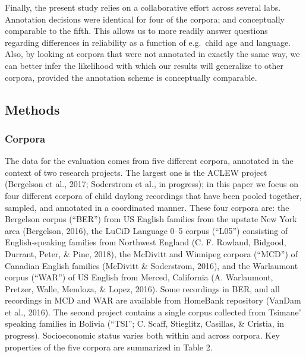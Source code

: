 \documentclass[english,floatsintext,man]{apa6}
\begin{document}
Finally, the present study relies on a collaborative effort across
several labs. Annotation decisions were identical for four of the
corpora; and conceptually comparable to the fifth. This allows us to
more readily answer questions regarding differences in reliability as a
function of e.g.~child age and language. Also, by looking at corpora
that were not annotated in exactly the same way, we can better infer the
likelihood with which our results will generalize to other corpora,
provided the annotation scheme is conceptually comparable.

\subsection{Methods}\label{methods}

\subsubsection{Corpora}\label{corpora}

The data for the evaluation comes from five different corpora, annotated
in the context of two research projects. The largest one is the ACLEW
project (Bergelson et al., 2017; Soderstrom et al., in progress); in
this paper we focus on four different corpora of child daylong
recordings that have been pooled together, sampled, and annotated in a
coordinated manner. These four corpora are: the Bergelson corpus
(\enquote{BER}) from US English families from the upstate New York area
(Bergelson, 2016), the LuCiD Language 0--5 corpus (\enquote{L05})
consisting of English-speaking families from Northwest England (C. F.
Rowland, Bidgood, Durrant, Peter, \& Pine, 2018), the McDivitt and
Winnipeg corpora (\enquote{MCD}) of Canadian English families (McDivitt
\& Soderstrom, 2016), and the Warlaumont corpus (\enquote{WAR}) of US
English from Merced, California (A. Warlaumont, Pretzer, Walle, Mendoza,
\& Lopez, 2016). Some recordings in BER, and all recordings in MCD and
WAR are available from HomeBank repository (VanDam et al., 2016). The
second project contains a single corpus collected from Tsimane' speaking
families in Bolivia (``TSI''; C. Scaff, Stieglitz, Casillas, \& Cristia,
in progress). Socioeconomic status varies both within and across
corpora. Key properties of the five corpora are summarized in Table 2.
\end{document}
